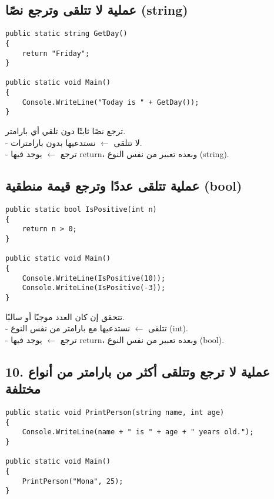 \documentclass[12pt]{article}
\begin{document}
\subsection{عملية لا تتلقى وترجع نصًا (\textenglish{string})}
\begin{boxExample}
\begin{english}
\begin{verbatim}
public static string GetDay()
{
    return "Friday";
}

public static void Main()
{
    Console.WriteLine("Today is " + GetDay());
}
\end{verbatim}
\end{english}
\end{boxExample}

ترجع نصًا ثابتًا دون تلقي أي بارامتر. \\
- لا تتلقى $\leftarrow$ نستدعيها بدون بارامترات. \\
- ترجع $\leftarrow$ يوجد فيها \textenglish{return}، وبعده تعبير من نفس النوع (\textenglish{string}).



\subsection{عملية تتلقى عددًا وترجع قيمة منطقية (\textenglish{bool})}
\begin{boxExample}
\begin{english}
\begin{verbatim}
public static bool IsPositive(int n)
{
    return n > 0;
}

public static void Main()
{
    Console.WriteLine(IsPositive(10));
    Console.WriteLine(IsPositive(-3));
}
\end{verbatim}
\end{english}
\end{boxExample}

تتحقق إن كان العدد موجبًا أو سالبًا. \\
- تتلقى $\leftarrow$ نستدعيها مع بارامتر من نفس النوع (\textenglish{int}). \\
- ترجع $\leftarrow$ يوجد فيها \textenglish{return}، وبعده تعبير من نفس النوع (\textenglish{bool}).



\subsection*{10. عملية لا ترجع وتتلقى أكثر من بارامتر من أنواع مختلفة}
\begin{boxExample}
\begin{english}
\begin{verbatim}
public static void PrintPerson(string name, int age)
{
    Console.WriteLine(name + " is " + age + " years old.");
}

public static void Main()
{
    PrintPerson("Mona", 25);
}
\end{verbatim}
\end{english}
\end{boxExample}
\end{document}
